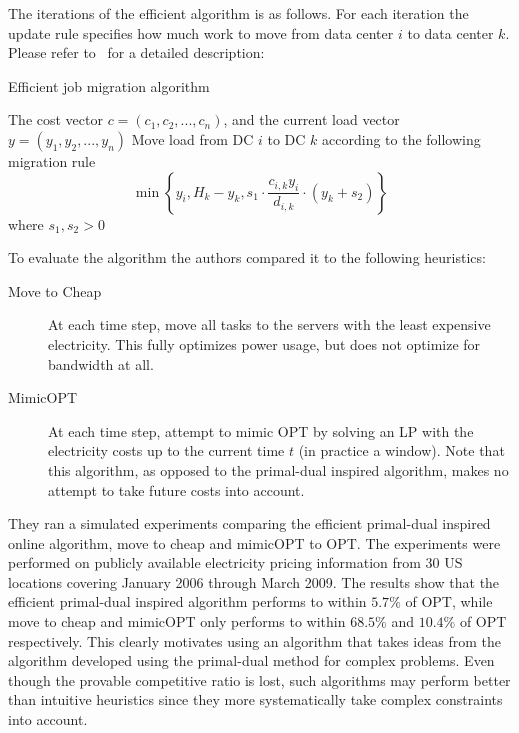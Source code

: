The iterations of the efficient algorithm is as follows. For each iteration the update rule specifies how much work to move from data center $i$ to data center $k$. Please refer to~\cite{buchbinder11:job-migration-techreport} for a detailed description:

\begin{algorithm}
\caption{Efficient job migration algorithm}
\label{job-migration-alg}
\begin{algorithmic}[1]
\REQUIRE The cost vector $c=(c_1,c_2,...,c_n)$, and the current load vector $y=(y_1,y_2,...,y_n)$
  \STATE Move load from DC $i$ to DC $k$ according to the following migration rule 
   \[ 
    \min \left\{ y_i, H_k - y_{k}, s_1 \cdot \frac{c_{i,k}y_i}{d_{i,k}} \cdot (y_k + s_2) \right\}
   \]
   where $s_1,s_2 > 0$
 \ENDFOR
\ENDFOR
\end{algorithmic}
\end{algorithm}

To evaluate the algorithm the authors compared it to the following heuristics:
\begin{description}
 \item[Move to Cheap] At each time step, move all tasks to the servers with the least expensive electricity. This fully optimizes power usage, but does not optimize for bandwidth at all.
 \item[MimicOPT] At each time step, attempt to mimic OPT by solving an LP with the electricity costs up to the current time $t$ (in practice a window). Note that this algorithm, as opposed to the primal-dual inspired algorithm, makes no attempt to take future costs into account.
\end{description}

They ran a simulated experiments comparing the efficient primal-dual inspired online algorithm, move to cheap and mimicOPT to OPT.
The experiments were performed on publicly available electricity pricing information from 30 US locations covering January 2006 through March 2009.
The results show that the efficient primal-dual inspired algorithm  performs to within $5.7\%$ of OPT, while move to cheap and mimicOPT only performs to within $68.5\%$ and $10.4\%$ of OPT respectively.
This clearly motivates using an algorithm that takes ideas from the algorithm developed using the primal-dual method for complex problems. 
Even though the provable competitive ratio is lost, such algorithms may perform better than intuitive heuristics since they more systematically take complex constraints into account.
